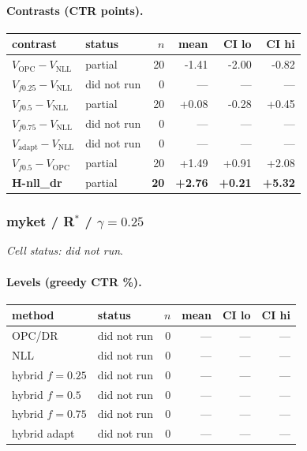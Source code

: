 \documentclass[10pt,a4paper]{article}
\begin{document}
\paragraph{Contrasts (CTR points).}
{\centering\small\begin{tabular}{llrrrr}
\toprule contrast & status & $n$ & mean & CI lo & CI hi \\
\midrule
$V_{\mathrm{OPC}}-V_{\mathrm{NLL}}$ & partial & 20 & -1.41 & -2.00 & -0.82 \\
$V_{f0.25}-V_{\mathrm{NLL}}$ & did not run & 0 & --- & --- & --- \\
$V_{f0.5}-V_{\mathrm{NLL}}$ & partial & 20 & +0.08 & -0.28 & +0.45 \\
$V_{f0.75}-V_{\mathrm{NLL}}$ & did not run & 0 & --- & --- & --- \\
$V_{\mathrm{adapt}}-V_{\mathrm{NLL}}$ & did not run & 0 & --- & --- & --- \\
$V_{f0.5}-V_{\mathrm{OPC}}$ & partial & 20 & +1.49 & +0.91 & +2.08 \\
\textbf{H-nll\_dr} & partial & \textbf{20} & \textbf{+2.76} & \textbf{+0.21} & \textbf{+5.32} \\
\bottomrule\end{tabular}\par}
\bigskip
\subsubsection{myket / R$^*$ / $\gamma=0.25$}
\emph{Cell status: did not run}.
\paragraph{Levels (greedy CTR \%).}
{\centering\small\begin{tabular}{llrrrr}
\toprule method & status & $n$ & mean & CI lo & CI hi \\
\midrule
OPC/DR & did not run & 0 & --- & --- & --- \\
NLL & did not run & 0 & --- & --- & --- \\
hybrid $f{=}0.25$ & did not run & 0 & --- & --- & --- \\
hybrid $f{=}0.5$ & did not run & 0 & --- & --- & --- \\
hybrid $f{=}0.75$ & did not run & 0 & --- & --- & --- \\
hybrid adapt & did not run & 0 & --- & --- & --- \\
\bottomrule\end{tabular}\par}
\end{document}
